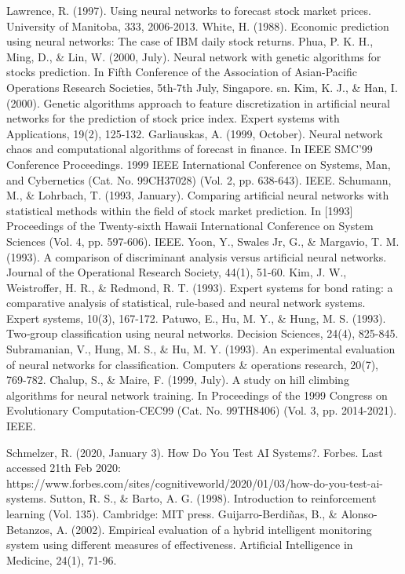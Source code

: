\documentclass[a4paper,12pt]{report}
\begin{document}
%
%
\begin{thebibliography}{9}
	Lawrence, R. (1997). Using neural networks to forecast stock market prices. University of Manitoba, 333, 2006-2013.
	White, H. (1988). Economic prediction using neural networks: The case of IBM daily stock returns.
	Phua, P. K. H., Ming, D., \& Lin, W. (2000, July). Neural network with genetic algorithms for stocks prediction. In Fifth Conference of the Association of Asian-Pacific Operations Research Societies, 5th-7th July, Singapore. sn.
	Kim, K. J., \& Han, I. (2000). Genetic algorithms approach to feature discretization in artificial neural networks for the prediction of stock price index. Expert systems with Applications, 19(2), 125-132.
	Garliauskas, A. (1999, October). Neural network chaos and computational algorithms of forecast in finance. In IEEE SMC'99 Conference Proceedings. 1999 IEEE International Conference on Systems, Man, and Cybernetics (Cat. No. 99CH37028) (Vol. 2, pp. 638-643). IEEE.
	Schumann, M., \& Lohrbach, T. (1993, January). Comparing artificial neural networks with statistical methods within the field of stock market prediction. In [1993] Proceedings of the Twenty-sixth Hawaii International Conference on System Sciences (Vol. 4, pp. 597-606). IEEE.
	Yoon, Y., Swales Jr, G., \& Margavio, T. M. (1993). A comparison of discriminant analysis versus artificial neural networks. Journal of the Operational Research Society, 44(1), 51-60.
	Kim, J. W., Weistroffer, H. R., \& Redmond, R. T. (1993). Expert systems for bond rating: a comparative analysis of statistical, rule‐based and neural network systems. Expert systems, 10(3), 167-172.
	Patuwo, E., Hu, M. Y., \& Hung, M. S. (1993). Two‐group classification using neural networks. Decision Sciences, 24(4), 825-845.
	Subramanian, V., Hung, M. S., \& Hu, M. Y. (1993). An experimental evaluation of neural networks for classification. Computers \& operations research, 20(7), 769-782.
	Chalup, S., \& Maire, F. (1999, July). A study on hill climbing algorithms for neural network training. In Proceedings of the 1999 Congress on Evolutionary Computation-CEC99 (Cat. No. 99TH8406) (Vol. 3, pp. 2014-2021). IEEE.
	
	Schmelzer, R. (2020, January 3). How Do You Test AI Systems?. Forbes. Last accessed 21th Feb 2020: https://www.forbes.com/sites/cognitiveworld/2020/01/03/how-do-you-test-ai-systems.
	Sutton, R. S., \& Barto, A. G. (1998). Introduction to reinforcement learning (Vol. 135). Cambridge: MIT press.
	\bibitem{}
	Guijarro-Berdiñas, B., \& Alonso-Betanzos, A. (2002). Empirical evaluation of a hybrid intelligent monitoring system using different measures of effectiveness. Artificial Intelligence in Medicine, 24(1), 71-96.
\end{thebibliography}
\end{document}
